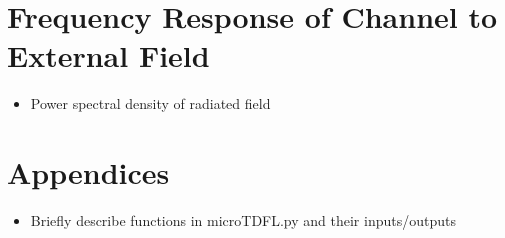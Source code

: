 \documentclass{article}
\begin{document}
\section{Frequency Response of Channel to External Field}
\begin{itemize}
\item Power spectral density of radiated field
\end{itemize}

\section*{Appendices}
\begin{itemize}
\item Briefly describe functions in microTDFL.py and their inputs/outputs
\end{itemize}


\end{document}
